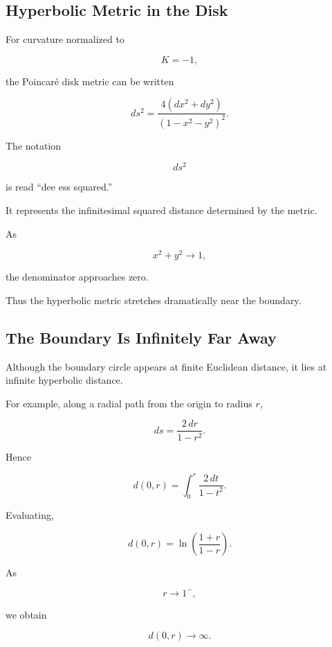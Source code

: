 \subsection{Hyperbolic Metric in the Disk}
\label{subsec:hyperbolic-metric-disk}

For curvature normalized to

\[
K=-1,
\]

the Poincar\'e disk metric can be written

\[
\boxed{
ds^2
=
\frac{4(dx^2+dy^2)}
     {(1-x^2-y^2)^2}.
}
\]

The notation

\[
ds^2
\]

is read ``dee ess squared.''

It represents the infinitesimal squared distance determined by the metric.

As

\[
x^2+y^2\to1,
\]

the denominator approaches zero.

Thus the hyperbolic metric stretches dramatically near the boundary.

\subsection{The Boundary Is Infinitely Far Away}
\label{subsec:hyperbolic-boundary-distance}

Although the boundary circle appears at finite Euclidean distance, it lies at
infinite hyperbolic distance.

For example, along a radial path from the origin to radius \(r\),

\[
ds=\frac{2\,dr}{1-r^2}.
\]

Hence

\[
d(0,r)
=
\int_0^r\frac{2\,dt}{1-t^2}.
\]

Evaluating,

\[
\boxed{
d(0,r)
=
\ln\left(\frac{1+r}{1-r}\right).
}
\]

As

\[
r\to1^{-},
\]

we obtain

\[
d(0,r)\to\infty.
\]

